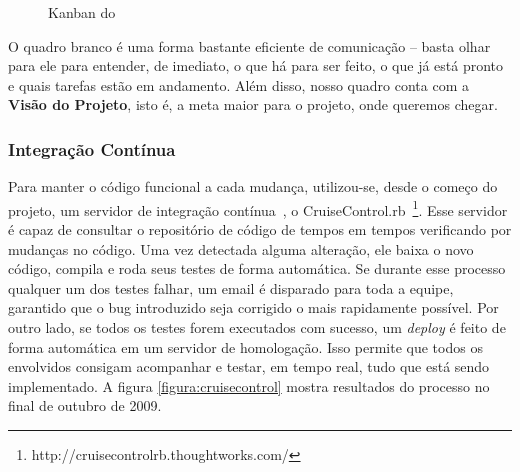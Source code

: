 \begin{figure}[H]
  \centering
  \caption{Kanban do \calopsita{}}\label{figura:kanban}
\end{figure}

O quadro branco é uma forma bastante eficiente de comunicação -- basta olhar para ele para entender, de imediato, o que há para ser feito, o que já está pronto e quais tarefas estão em andamento. Além disso, nosso quadro conta com a \textbf{Visão do Projeto}, isto é, a meta maior para o projeto, onde queremos chegar.

\subsubsection*{Integração Contínua}

Para manter o código funcional a cada mudança, utilizou-se, desde o começo do projeto, um servidor de integração contínua~\cite{ci}, o CruiseControl.rb~\footnote{http://cruisecontrolrb.thoughtworks.com/}. Esse servidor é capaz de consultar o repositório de código de tempos em tempos verificando por mudanças no código. Uma vez detectada alguma alteração, ele baixa o novo código, compila e roda seus testes de forma automática. Se durante esse processo qualquer um dos testes falhar, um email é disparado para toda a equipe, garantido que o bug introduzido seja corrigido o mais rapidamente possível. Por outro lado, se todos os testes forem executados com sucesso, um \textit{deploy} é feito de forma automática em um servidor de homologação. Isso permite que todos os envolvidos consigam acompanhar e testar, em tempo real, tudo que está sendo implementado. A figura \ref{figura:cruisecontrol} mostra resultados do processo no final de outubro de 2009.

